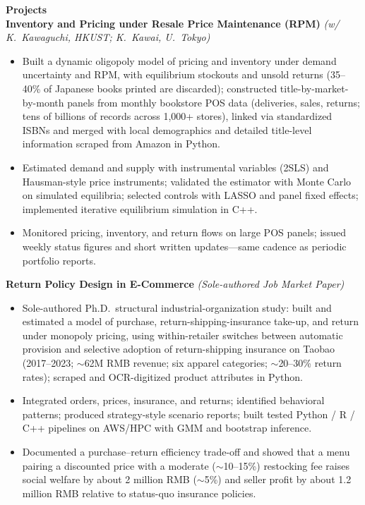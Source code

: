 \documentclass[11pt,letterpaper]{article}
\begin{document}
{\large \textbf{Projects}}\\[-0.5pt]
\textbf{Inventory and Pricing under Resale Price Maintenance (RPM)} \textit{(w/ K.\ Kawaguchi, HKUST; K.\ Kawai, U.\ Tokyo)}\\
\vspace{-6pt}
\begin{itemize}
  \item Built a dynamic oligopoly model of pricing and inventory under demand uncertainty and RPM, with equilibrium stockouts and unsold returns (35--40\% of Japanese books printed are discarded); constructed title-by-market-by-month panels from monthly bookstore POS data (deliveries, sales, returns; tens of billions of records across 1{,}000+ stores), linked via standardized ISBNs and merged with local demographics and detailed title-level information scraped from Amazon in Python.
  \item Estimated demand and supply with instrumental variables (2SLS) and Hausman-style price instruments; validated the estimator with Monte Carlo on simulated equilibria; selected controls with LASSO and panel fixed effects; implemented iterative equilibrium simulation in C++.
  \item Monitored pricing, inventory, and return flows on large POS panels; issued weekly status figures and short written updates---same cadence as periodic portfolio reports.
\end{itemize}
\vspace{-3pt}
\textbf{Return Policy Design in E-Commerce} \textit{(Sole-authored Job Market Paper)}\\
\vspace{-6pt}
\begin{itemize}
  \item Sole-authored Ph.D.\ structural industrial-organization study: built and estimated a model of purchase, return-shipping-insurance take-up, and return under monopoly pricing, using within-retailer switches between automatic provision and selective adoption of return-shipping insurance on Taobao (2017--2023; \(\sim\)62M RMB revenue; six apparel categories; \(\sim\)20--30\% return rates); scraped and OCR-digitized product attributes in Python.
  \item Integrated orders, prices, insurance, and returns; identified behavioral patterns; produced strategy-style scenario reports; built tested Python / R / C++ pipelines on AWS/HPC with GMM and bootstrap inference.
  \item Documented a purchase--return efficiency trade-off and showed that a menu pairing a discounted price with a moderate (\(\sim\)10--15\%) restocking fee raises social welfare by about 2 million RMB (\(\sim\)5\%) and seller profit by about 1.2 million RMB relative to status-quo insurance policies.
\end{itemize}
\end{document}
